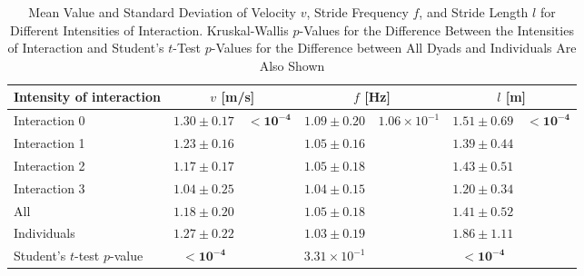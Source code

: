 \begin{table*}[!t]

\caption{Mean Value and Standard Deviation of Velocity $v$, Stride Frequency $f$, and Stride Length $l$ for Different Intensities of Interaction. Kruskal-Wallis $p$-Values for the Difference Between the Intensities of Interaction and Student's $t$-Test $p$-Values for the Difference between All Dyads and Individuals Are Also Shown\label{tab:gait_stats}}
\centering
\begin{tabular}{lcccccc}
\toprule
Intensity of interaction & \multicolumn{2}{c}{$v$ [m/s]} & \multicolumn{2}{c}{$f$ [Hz]} & \multicolumn{2}{c}{$l$ [m]} \\
\midrule
Interaction 0 & $1.30 \pm 0.17$ & \multirow{4}{*}{$\mathbf{< 10^{-4}}$} &$1.09 \pm 0.20$ & \multirow{4}{*}{$1.06 \times 10^{-1}$} &$1.51 \pm 0.69$ & \multirow{4}{*}{$\mathbf{< 10^{-4}}$} \\
Interaction 1 & $1.23 \pm 0.16$ & &$1.05 \pm 0.16$ & &$1.39 \pm 0.44$ & \\
Interaction 2 & $1.17 \pm 0.17$ & &$1.05 \pm 0.18$ & &$1.43 \pm 0.51$ & \\
Interaction 3 & $1.04 \pm 0.25$ & &$1.04 \pm 0.15$ & &$1.20 \pm 0.34$ & \\
\midrule
All & $1.18 \pm 0.20$ & &$1.05 \pm 0.18$ & &$1.41 \pm 0.52$ &\\
Individuals & $1.27 \pm 0.22$ & & $1.03 \pm 0.19$ & &$1.86 \pm 1.11$  & \\
\midrule
Student's $t$-test $p$-value & $\mathbf{< 10^{-4}}$ & &$3.31 \times 10^{-1}$ & &$\mathbf{< 10^{-4}}$ &\\
\bottomrule
\end{tabular}
\end{table*}

